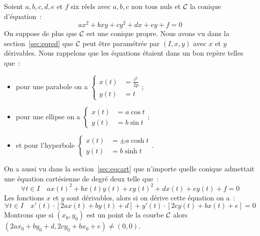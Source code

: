 Soient \(a, b, c, d, e\) et \(f\) six réels avec \(a, b, c\) non tous nuls et 
\(\mathcal{C}_{{}}\) la conique d'équation~:
\begin{equation}
  ax^2 + bxy + cy^2 + dx + ey + f = 0
\end{equation}
On suppose de plus que \(\mathcal{C}_{{}}\) est une conique propre. Nous avons vu dans 
la section~\ref{sec:eqred} que \(\mathcal{C}_{{}}\) peut être paramétrée par 
\((I, x, y)\) avec \(x\) et \(y\) dérivables. Nous rappelons que les équations 
étaient dans un bon repère telles que~:
\begin{itemize}
  \item pour une parabole on a \(\begin{cases} x(t) &= \frac{t^2}{2p} \\ y(t) 
    &= t \end{cases}\);
  \item pour une ellipse on a \(\begin{cases} x(t) &= a\cos t\\ y(t) &= 
      b\sin t \end{cases}\);
  \item  et pour l'hyperbole \(\begin{cases} x(t) &= \pm a\cosh t\\ y(t) 
        &= b\sinh t \end{cases}\).
\end{itemize}
On a aussi vu dans la section~\ref{sec:eqcart} que n'importe quelle 
conique admettait une équation cartésienne de degré deux telle que~:
\begin{equation}
  \forall t \in I \quad   ax(t)^2 + bx(t)y(t) + cy(t)^2 + dx(t) + ey(t) + f = 0
\end{equation}
Les fonctions \(x\) et \(y\) sont dérivables, alors si on dérive cette 
équation on a~:
\begin{equation}
  \forall t \in I \quad x'(t) \cdot [2ax(t) + by(t) + d] + y'(t) \cdot 
  [2cy(t) + bx(t) + e] = 0
\end{equation}
Montrons que si \((x_0, y_0)\) est un point de la courbe \(\mathcal{C}_{{}}\) 
alors \((2ax_0 + by_0 + d, 2cy_0 + bx_0 + e)\neq (0, 0)\).

